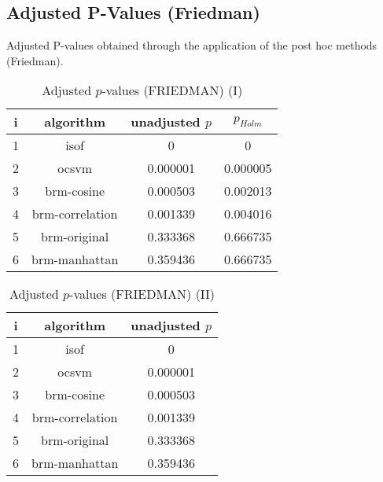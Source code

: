 \documentclass[a4paper,10pt]{article}
\begin{document}
\begin{landscape}
\newpage

\section{Adjusted P-Values (Friedman)}


Adjusted P-values obtained through the application of the post hoc methods (Friedman).

\begin{table}[!htp]
\centering\small
\begin{tabular}{cccc}
i&algorithm&unadjusted $p$&$p_{Holm}$\\
\hline1&isof&0&0\\2&ocsvm&0.000001&0.000005\\3&brm-cosine&0.000503&0.002013\\4&brm-correlation&0.001339&0.004016\\5&brm-original&0.333368&0.666735\\6&brm-manhattan&0.359436&0.666735\\\hline
\end{tabular}
\caption{Adjusted $p$-values (FRIEDMAN) (I)}
\end{table}
\begin{table}[!htp]
\centering\small
\begin{tabular}{ccc}
i&algorithm&unadjusted $p$\\
\hline1&isof&0\\2&ocsvm&0.000001\\3&brm-cosine&0.000503\\4&brm-correlation&0.001339\\5&brm-original&0.333368\\6&brm-manhattan&0.359436\\\hline
\end{tabular}
\caption{Adjusted $p$-values (FRIEDMAN) (II)}
\end{table}

\newpage
\end{landscape}
\end{document}
